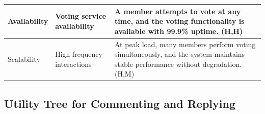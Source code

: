 \documentclass{article}
\begin{document}
\begin{table}[H]
\begin{tabular}{|p{3cm}|p{4cm}|p{7cm}|}
        Availability
                                   & Voting service availability
                                   & A member attempts to vote at any time, and the voting functionality is available with 99.9\% uptime. (H,H)                                                \\
        \hline

        Scalability
                                   & High-frequency interactions
                                   & At peak load, many members perform voting simultaneously, and the system maintains stable performance without degradation. (H,M)                          \\
        \hline
    \end{tabular}
\end{table}

\subsection{Utility Tree for Commenting and Replying}
\end{document}
